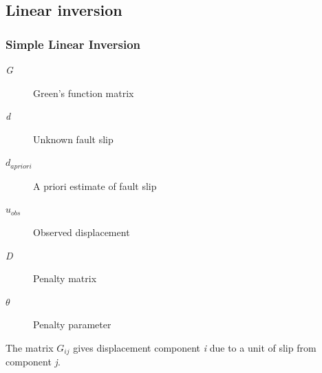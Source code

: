 \documentclass{beamer}
\begin{document}
\subsection{Linear inversion}

\begin{frame}
  \frametitle{Simple Linear Inversion}

  \begin{description}
  \item[\textit{G}] Green's function matrix
  \item[\textit{d}] Unknown fault slip
  \item[\begin{math}d_{apriori}\end{math}] A priori estimate of fault slip
  \item[\begin{math}u_{obs}\end{math}] Observed displacement
  \item[\textit{D}] Penalty matrix
  \item[\begin{math}\theta\end{math}] Penalty parameter
  \end{description}
  
  \vfill The matrix \begin{math}{G_{ij}}\end{math} gives displacement
  component \textit{i} due to a unit of slip from component \textit{j}.
\vfill

\end{frame}
\end{document}
